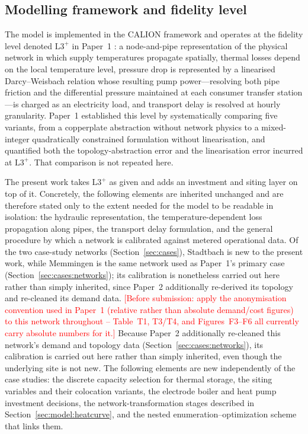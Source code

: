 \documentclass[review,3p]{elsarticle}
\newcommand{\placeholder}[1]{\textcolor{red}{[#1]}}
\newcommand{\Lplus}{\mathrm{L3}^{+}}
\begin{document}
\subsection{Modelling framework and fidelity level}
\label{sec:model:framework}

The model is implemented in the CALION framework and operates at the
fidelity level denoted $\Lplus$ in Paper~1 \cite{Ruess.2026}: a
node-and-pipe representation of the physical network in which supply
temperatures propagate spatially, thermal losses depend on the local
temperature level, pressure drop is represented by a linearised
Darcy--Weisbach relation whose resulting pump power---resolving both
pipe friction and the differential pressure maintained at each consumer
transfer station---is charged as an electricity load, and transport
delay is resolved at hourly granularity. Paper~1 established this level by systematically comparing
five variants, from a copperplate abstraction without network physics to
a mixed-integer quadratically constrained formulation without
linearisation, and quantified both the topology-abstraction error and
the linearisation error incurred at $\Lplus$. That comparison is not
repeated here.

The present work takes $\Lplus$ as given and adds an investment and
siting layer on top of it. Concretely, the following elements are
inherited unchanged and are therefore stated only to the extent needed
for the model to be readable in isolation: the hydraulic representation,
the temperature-dependent loss propagation along pipes, the transport
delay formulation, and the general procedure by which a network is
calibrated against metered operational data. Of the two case-study
networks (Section~\ref{sec:cases}), Stadtbach is new to the
present work, while Memmingen is the same network used
as Paper~1's primary case (Section~\ref{sec:cases:networks}); its
calibration is nonetheless carried out here rather than simply
inherited, since Paper~2 additionally re-derived its topology and
re-cleaned its demand data.
\placeholder{Before submission: apply the anonymisation convention used
in Paper~1 (relative rather than absolute demand/cost figures) to this
network throughout -- Table~T1, T3/T4, and Figures~F3--F6 all currently
carry absolute numbers for it.}
Because Paper~2 additionally re-cleaned this network's demand and
topology data (Section~\ref{sec:cases:networks}), its calibration is
carried out here rather than simply inherited, even though the
underlying site is not new. The
following elements are new independently of the case studies: the
discrete capacity selection for thermal storage, the siting variables
and their colocation variants, the electrode boiler and heat pump
investment decisions, the network-transformation stages described in
Section~\ref{sec:model:heatcurve}, and the nested
enumeration--optimization scheme that links them.
\end{document}
